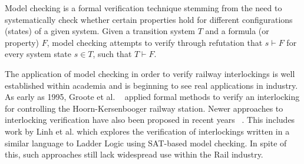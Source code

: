 \documentclass[conference,compsoc]{IEEEtran}
\begin{document}



Model checking is a formal verification technique stemming from the need to systematically
check whether certain properties hold for different configurations (states) of a given system.
Given a transition system $T$ and a formula (or property) $F$, model checking attempts to verify through refutation that $s \vdash F$ for every system state $s \in T$, such that $T \vdash F$. 

The application of model checking in order to verify railway interlockings is well established within
academia and is beginning to see real applications in industry. As early as 1995, Groote
et al. ~\cite{groote1995safety} applied formal methods to verify an interlocking for controlling the Hoorn-Kersenbooger railway station. Newer approaches to interlocking verification have also been proposed in recent
years ~\cite{fantechi2012some, ferrari2011model, haxthausen2008modelling}. This includes work by Linh et al. which explores the verification
of interlockings written in a similar language to Ladder Logic using SAT-based model
checking. In spite of this, such approaches still lack widespread use within the Rail industry. 
\end{document}
